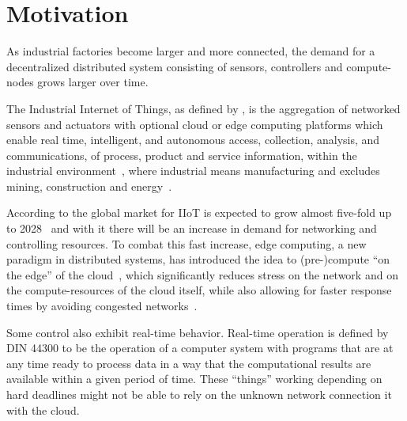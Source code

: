 \section{Motivation}


As industrial factories become larger and more connected, the demand for a
decentralized distributed system consisting of sensors, controllers and
compute-nodes grows larger over time.

The Industrial Internet of Things, as defined by
\citeauthor{boyes_industrial_2018}, is the aggregation of networked sensors and
actuators with optional cloud or edge computing platforms which enable real
time, intelligent, and autonomous access, collection, analysis, and
communications, of process, product and service information, within the
industrial environment~\cite{boyes_industrial_2018}, where industrial means
manufacturing and excludes mining, construction and
energy~\cite{noauthor_industry_nodate}.

According to \citeauthor{placek_industrial_nodate} the global market for IIoT is
expected to grow almost five-fold up to 2028~\cite{placek_industrial_nodate}
and with it there will be an increase in demand for networking and controlling
resources. To combat this fast increase, edge computing, a new paradigm in
distributed systems, has introduced the idea to (pre-)compute \enquote{on the
edge} of the cloud~\cite{shi_edge_2016}, which significantly reduces stress on
the network and on the compute-resources of the cloud itself, while also
allowing for faster response times by avoiding congested
networks~\cite{shi_edge_2016}.

Some control also exhibit real-time behavior. Real-time operation is defined by
DIN 44300 to be the operation of a computer system with programs that are at any
time ready to process data in a way that the computational results are available
within a given period of time. These \enquote{things} working depending on hard
deadlines might not be able to rely on the unknown network connection it with
the cloud.
 



